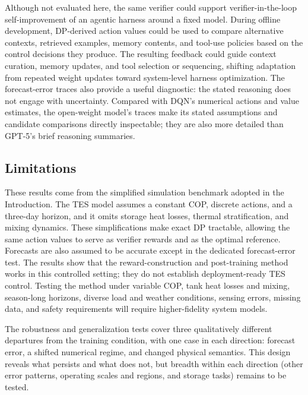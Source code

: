 \documentclass[11pt]{article}
\begin{document}
Although not evaluated here, the same verifier could support verifier-in-the-loop self-improvement of an agentic harness around a fixed model. During offline development, DP-derived action values could be used to compare alternative contexts, retrieved examples, memory contents, and tool-use policies based on the control decisions they produce. The resulting feedback could guide context curation, memory updates, and tool selection or sequencing, shifting adaptation from repeated weight updates toward system-level harness optimization. The forecast-error traces also provide a useful diagnostic: the stated reasoning does not engage with uncertainty. Compared with DQN's numerical actions and value estimates, the open-weight model's traces make its stated assumptions and candidate comparisons directly inspectable; they are also more detailed than GPT-5's brief reasoning summaries.

\subsection{Limitations}\label{subsec:limitations}
These results come from the simplified simulation benchmark adopted in the Introduction. The TES model assumes a constant COP, discrete actions, and a three-day horizon, and it omits storage heat losses, thermal stratification, and mixing dynamics. These simplifications make exact DP tractable, allowing the same action values to serve as verifier rewards and as the optimal reference. Forecasts are also assumed to be accurate except in the dedicated forecast-error test. The results show that the reward-construction and post-training method works in this controlled setting; they do not establish deployment-ready TES control. Testing the method under variable COP, tank heat losses and mixing, season-long horizons, diverse load and weather conditions, sensing errors, missing data, and safety requirements will require higher-fidelity system models.

The robustness and generalization tests cover three qualitatively different departures from the training condition, with one case in each direction: forecast error, a shifted numerical regime, and changed physical semantics. This design reveals what persists and what does not, but breadth within each direction (other error patterns, operating scales and regions, and storage tasks) remains to be tested.
\end{document}
